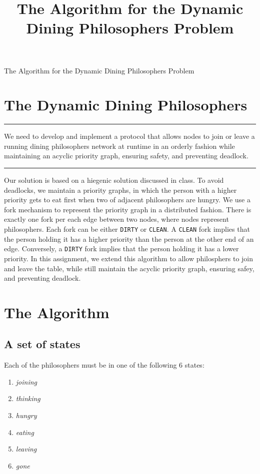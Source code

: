 \documentclass[11pt]{article}
\title{The Algorithm for the Dynamic Dining Philosophers Problem}
\newenvironment{problem}[1]{
\medskip \hrule \medskip
\noindent {\bf Problem #1.}
}{
\medskip \hrule \medskip
}
\begin{document}
\pagestyle{fancy}


\vspace*{0.1in}
\begin{center} \Large The Algorithm for the Dynamic Dining Philosophers Problem \end{center}

\section{The Dynamic Dining Philosophers}
\begin{problem}{Statement}
We need to develop and implement a protocol that allows nodes to join or leave a running dining philosophers network at runtime in an orderly fashion while maintaining an acyclic priority graph, ensuring safety, and preventing deadlock.
\end{problem}

Our solution is based on a hiegenic solution discussed in class. To avoid deadlocks, we maintain a priority graphs, in which the person with a higher priority gets to eat first when two of adjacent philosophers are hungry. We use a fork mechanism to represent the priority graph in a distributed fashion. There is exactly one fork per each edge between two nodes, where nodes represent philosophers. Each fork can be either \texttt{DIRTY} or \texttt{CLEAN}. A \texttt{CLEAN} fork implies that the person holding it has a higher priority than the person at the other end of an edge. Conversely, a \texttt{DIRTY} fork implies that the person holding it has a lower priority. In this assignment, we extend this algorithm to allow philosphers to join and leave the table, while still maintain the acyclic priority graph, ensuring safey, and preventing deadlock.


\section{The Algorithm}
\subsection{A set of states}
Each of the philosophers must be in one of the following 6 states:
\begin{enumerate}
\item \textit{joining}
\item \textit{thinking}
\item \textit{hungry}
\item \textit{eating}
\item \textit{leaving}
\item \textit{gone}
\end{enumerate}
\end{document}
